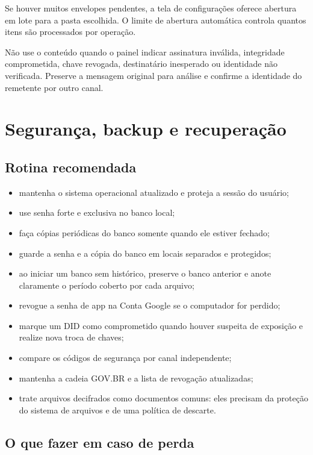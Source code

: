 \documentclass[11pt,a4paper]{article}
\begin{document}
Se houver muitos envelopes pendentes, a tela de configurações oferece abertura em lote para a pasta escolhida. O limite de abertura automática controla quantos itens são processados por operação.

\begin{importantbox}
  Não use o conteúdo quando o painel indicar assinatura inválida, integridade comprometida, chave revogada, destinatário inesperado ou identidade não verificada. Preserve a mensagem original para análise e confirme a identidade do remetente por outro canal.
\end{importantbox}

\section{Segurança, backup e recuperação}

\subsection{Rotina recomendada}

\begin{itemize}
  \item mantenha o sistema operacional atualizado e proteja a sessão do usuário;
  \item use senha forte e exclusiva no banco local;
  \item faça cópias periódicas do banco somente quando ele estiver fechado;
  \item guarde a senha e a cópia do banco em locais separados e protegidos;
  \item ao iniciar um banco sem histórico, preserve o banco anterior e anote claramente o período coberto por cada arquivo;
  \item revogue a senha de app na Conta Google se o computador for perdido;
  \item marque um DID como comprometido quando houver suspeita de exposição e realize nova troca de chaves;
  \item compare os códigos de segurança por canal independente;
  \item mantenha a cadeia GOV.BR e a lista de revogação atualizadas;
  \item trate arquivos decifrados como documentos comuns: eles precisam da proteção do sistema de arquivos e de uma política de descarte.
\end{itemize}

\subsection{O que fazer em caso de perda}
\end{document}

